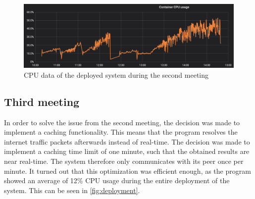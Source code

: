 \begin{figure}
    \centering
    \includegraphics[width=\textwidth]{gfx/load-60.png}
    \caption{CPU data of the deployed system during the second meeting}
    \label{fig:60}
\end{figure}

\subsection{Third meeting}
In order to solve the issue from the second meeting, the decision was made to implement a caching functionality. This means that the program resolves the internet traffic packets afterwards instead of real-time. The decision was made to implement a caching time limit of one minute, such that the obtained results are near real-time. The system therefore only communicates with its peer once per minute. It turned out that this optimization was efficient enough, as the program showed an average of 12\% CPU usage during the entire deployment of the system. This can be seen in \autoref{fig:deployment}.

